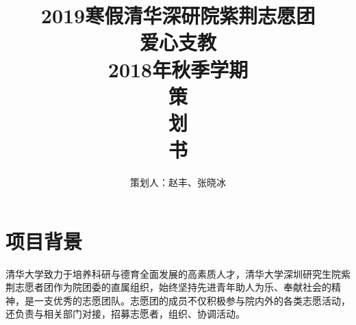 \documentclass[12pt]{ctexart}
\begin{document}
\title{
    \vspace{-0.5in}
    \textmd{\textbf{\huge{2019寒假清华深研院紫荆志愿团 \\ 爱心支教}}}\\
    \normalsize\vspace{0.1in}\Large{2018年秋季学期}\\
    \vspace{1in}
     \textbf{\huge{策}}\\
    \vspace{1in}
     \textbf{\huge{划}}\\
    \vspace{1in}
     \textbf{\huge{书}}\\
    \vspace{1in}
}
\author{策划人：赵丰、张晓冰}
\maketitle
\thispagestyle{empty}
\pagebreak
\pagestyle{runningpage}
\tableofcontents





\section{项目背景}
清华大学致力于培养科研与德育全面发展的高素质人才，清华大学深圳研究生院紫荆志愿者团作为院团委的直属组织，始终坚持先进青年助人为乐、奉献社会的精神，是一支优秀的志愿团队。志愿团的成员不仅积极参与院内外的各类志愿活动，还负责与相关部门对接，招募志愿者，组织、协调活动。

\end{document}
